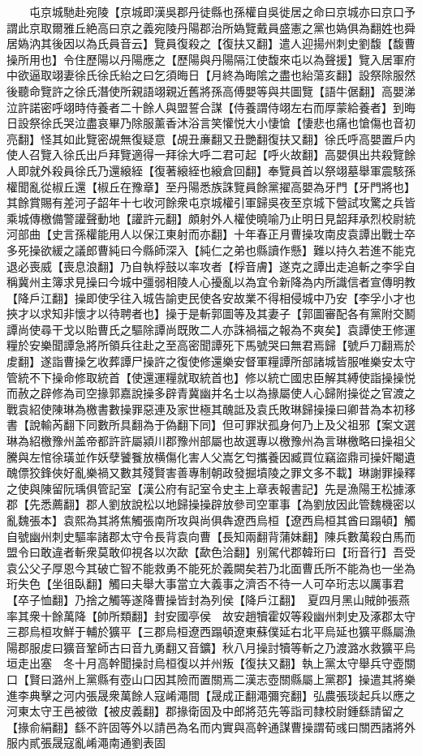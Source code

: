 　　屯京城馳赴宛陵【京城即漢吳郡丹徒縣也孫權自吳徙居之命曰京城亦曰京口予謂此京取爾雅丘絶高曰京之義宛陵丹陽郡治所媯覽戴員盛憲之黨也媯俱為翻姓也舜居媯汭其後因以為氏員音云】覽員復殺之【復扶又翻】遣人迎揚州刺史劉馥【馥曹操所用也】令住歷陽以丹陽應之【歷陽與丹陽隔江使馥來屯以為聲援】覽入居軍府中欲逼取翊妻徐氏徐氏紿之曰乞須晦日【月終為晦隂之盡也紿蕩亥翻】設祭除服然後聽命覽許之徐氏潛使所親語翊親近舊將孫高傅嬰等與共圖覽【語牛倨翻】高嬰涕泣許諾密呼翊時侍養者二十餘人與盟誓合謀【侍養謂侍翊左右而厚蒙給養者】到晦日設祭徐氏哭泣盡哀畢乃除服薰香沐浴言笑懽悦大小悽愴【悽悲也痛也愴傷也音初亮翻】怪其如此覽密覘無復疑意【覘丑亷翻又丑艷翻復扶又翻】徐氏呼高嬰置戶内使人召覽入徐氏出戶拜覽適得一拜徐大呼二君可起【呼火故翻】高嬰俱出共殺覽餘人即就外殺員徐氏乃還縗絰【復著縗絰也縗倉回翻】奉覽員首以祭翊墓舉軍震駭孫權聞亂從椒丘還【椒丘在豫章】至丹陽悉族誅覽員餘黨擢高嬰為牙門【牙門將也】其餘賞賜有差河子韶年十七收河餘衆屯京城權引軍歸吳夜至京城下營試攻驚之兵皆乘城傳檄備警讙聲動地【讙許元翻】頗射外人權使曉喻乃止明日見韶拜承烈校尉統河部曲【史言孫權能用人以保江東射而亦翻】十年春正月曹操攻南皮袁譚出戰士卒多死操欲緩之議郎曹純曰今縣師深入【純仁之弟也縣讀作懸】難以持久若進不能克退必喪威【喪息浪翻】乃自執桴鼓以率攻者【桴音膚】遂克之譚出走追斬之李孚自稱冀州主簿求見操曰今城中彊弱相陵人心擾亂以為宜令新降為内所識信者宣傳明教【降戶江翻】操即使孚往入城告諭吏民使各安故業不得相侵城中乃安【李孚小才也挾才以求知非懷才以待聘者也】操于是斬郭圖等及其妻子【郭圖審配各有黨附交鬭譚尚使尋干戈以貽曹氏之驅除譚尚既敗二人亦誅禍福之報為不爽矣】袁譚使王修運糧於安樂聞譚急將所領兵往赴之至高密聞譚死下馬號哭曰無君焉歸【號戶刀翻焉於䖍翻】遂詣曹操乞收葬譚尸操許之復使修還樂安督軍糧譚所部諸城皆服唯樂安太守管統不下操命修取統首【使還運糧就取統首也】修以統亡國忠臣解其縛使詣操操悦而赦之辟修為司空掾郭嘉說操多辟青冀幽并名士以為掾屬使人心歸附操從之官渡之戰袁紹使陳琳為檄書數操罪惡連及家世極其醜詆及袁氏敗琳歸操操曰卿昔為本初移書【說輸芮翻下同數所具翻為于偽翻下同】但可罪狀孤身何乃上及父祖邪【案文選琳為紹檄豫州盖帝都許許屬潁川郡豫州部屬也故選專以檄豫州為言琳檄略曰操祖父騰與左悺徐璜並作妖孽饕餮放横傷化害人父嵩乞匄攜養因臧買位竊盜鼎司操奸閹遺醜僄狡鋒俠好亂樂禍又數其殘賢害善專制朝政發掘墳陵之罪文多不載】琳謝罪操釋之使與陳留阮瑀俱管記室【漢公府有記室令史主上章表報書記】先是漁陽王松據涿郡【先悉薦翻】郡人劉放說松以地歸操操辟放參司空軍事【為劉放因此管魏機密以亂魏張本】袁熙為其將焦觸張南所攻與尚俱犇遼西烏桓【遼西烏桓其酋曰蹋頓】觸自號幽州刺史驅率諸郡太守令長背袁向曹【長知兩翻背蒲妹翻】陳兵數萬殺白馬而盟令曰敢違者斬衆莫敢仰視各以次歃【歃色洽翻】别駕代郡韓珩曰【珩音行】吾受袁公父子厚恩今其破亡智不能救勇不能死於義闕矣若乃北面曹氏所不能為也一坐為珩失色【坐徂臥翻】觸曰夫舉大事當立大義事之濟否不待一人可卒珩志以厲事君【卒子恤翻】乃捨之觸等遂降曹操皆封為列侯【降戶江翻】　夏四月黑山賊帥張燕率其衆十餘萬降【帥所類翻】封安國亭侯　故安趙犢霍奴等殺幽州刺史及涿郡太守三郡烏桓攻鮮于輔於獷平【三郡烏桓遼西蹋頓遼東蘇僕延右北平烏延也獷平縣屬漁陽郡服䖍曰獷音鞏師古曰音九勇翻又音鑛】秋八月操討犢等斬之乃渡潞水救獷平烏垣走出塞　冬十月高幹聞操討烏桓復以并州叛【復扶又翻】執上黨太守舉兵守壺關口【賢曰潞州上黨縣有壺山口因其險而置關焉二漢志壺關縣屬上黨郡】操遣其將樂進李典擊之河内張晟衆萬餘人寇崤澠間【晟成正翻澠彌兖翻】弘農張琰起兵以應之河東太守王邑被徵【被皮義翻】郡掾衛固及中郎將范先等詣司隸校尉鍾繇請留之【掾俞絹翻】繇不許固等外以請邑為名而内實與高幹通謀曹操謂荀彧曰關西諸將外服内貳張晟寇亂崤澠南通劉表固